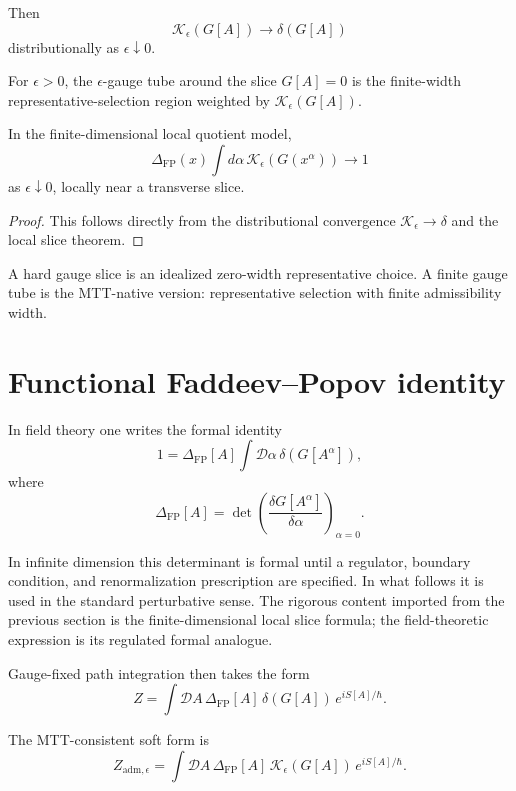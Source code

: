 \documentclass[11pt]{article}
\newcommand{\FP}{\mathrm{FP}}
\newcommand{\adm}{\mathrm{adm}}
\begin{document}
Then
\[
\mathcal K_\epsilon(G[A])\to \delta(G[A])
\]
distributionally as \(\epsilon\downarrow0\).

\begin{definition}
For \(\epsilon>0\), the \(\epsilon\)-gauge tube around the slice \(G[A]=0\) is the finite-width representative-selection region weighted by \(\mathcal K_\epsilon(G[A])\).
\end{definition}

\begin{proposition}
In the finite-dimensional local quotient model,
\[
\Delta_{\FP}(x)\int d\alpha\,\mathcal K_\epsilon(G(x^\alpha))
\to 1
\]
as \(\epsilon\downarrow0\), locally near a transverse slice.
\end{proposition}

\begin{proof}
This follows directly from the distributional convergence \(\mathcal K_\epsilon\to\delta\) and the local slice theorem. \end{proof}

\begin{remark}
A hard gauge slice is an idealized zero-width representative choice. A finite gauge tube is the MTT-native version: representative selection with finite admissibility width.
\end{remark}

\section{Functional Faddeev--Popov identity}

In field theory one writes the formal identity
\[
1=\Delta_{\FP}[A]\int\mathcal D\alpha\,\delta(G[A^\alpha]),
\]
where
\[
\Delta_{\FP}[A]=\det\left(\frac{\delta G[A^\alpha]}{\delta\alpha}\right)_{\alpha=0}.
\]

In infinite dimension this determinant is formal until a regulator, boundary condition, and renormalization prescription are specified. In what follows it is used in the standard perturbative sense. The rigorous content imported from the previous section is the finite-dimensional local slice formula; the field-theoretic expression is its regulated formal analogue.

Gauge-fixed path integration then takes the form
\[
Z
=
\int \mathcal DA\,\Delta_{\FP}[A]\,\delta(G[A])\,e^{iS[A]/\hbar}.
\]

The MTT-consistent soft form is
\[
Z_{\adm,\epsilon}
=
\int \mathcal DA\,\Delta_{\FP}[A]\,
\mathcal K_\epsilon(G[A])\,
e^{iS[A]/\hbar}.
\]
\end{document}
